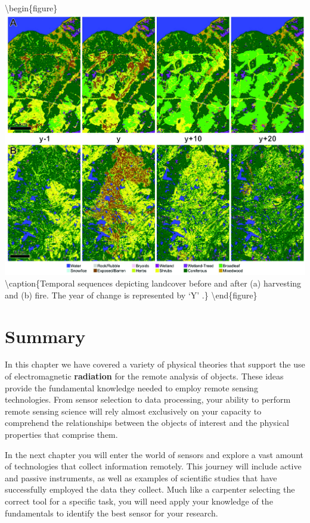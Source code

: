 \documentclass[
]{book}
\begin{document}
\textbackslash begin\{figure\}
\includegraphics[width=0.9\linewidth]{images/11-hermo-disturbance} \textbackslash caption\{Temporal sequences depicting landcover before and after (a) harvesting and (b) fire. The year of change is represented by `Y' \citep{hermosilla_disturbance-informed_2018}.\}\label{fig:11-hermo-disturb}
\textbackslash end\{figure\}

\hypertarget{summary-9}{%
\section{Summary}\label{summary-9}}

In this chapter we have covered a variety of physical theories that
support the use of electromagnetic \textbf{radiation} for the remote analysis
of objects. These ideas provide the fundamental knowledge needed to
employ remote sensing technologies. From sensor selection to data
processing, your ability to perform remote sensing science will rely
almost exclusively on your capacity to comprehend the relationships
between the objects of interest and the physical properties that
comprise them.

In the next chapter you will enter the world of sensors and explore a
vast amount of technologies that collect information remotely. This
journey will include active and passive instruments, as well as examples
of scientific studies that have successfully employed the data they
collect. Much like a carpenter selecting the correct tool for a specific
task, you will need apply your knowledge of the fundamentals to identify
the best sensor for your research.
\end{document}
